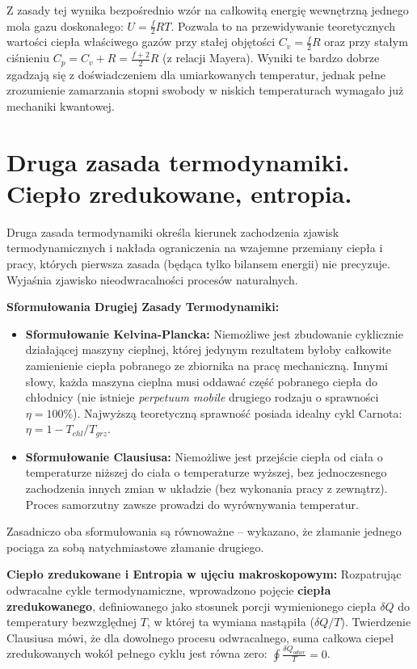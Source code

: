 \documentclass[11pt, a4paper]{article}
\begin{document}
Z zasady tej wynika bezpośrednio wzór na całkowitą energię wewnętrzną jednego mola gazu doskonałego: $U = \frac{f}{2}RT$. Pozwala to na przewidywanie teoretycznych wartości ciepła właściwego gazów przy stałej objętości $C_v = \frac{f}{2}R$ oraz przy stałym ciśnieniu $C_p = C_v + R = \frac{f+2}{2}R$ (z relacji Mayera). Wyniki te bardzo dobrze zgadzają się z doświadczeniem dla umiarkowanych temperatur, jednak pełne zrozumienie zamarzania stopni swobody w niskich temperaturach wymagało już mechaniki kwantowej.

\section{Druga zasada termodynamiki. Ciepło zredukowane, entropia.}

Druga zasada termodynamiki określa kierunek zachodzenia zjawisk termodynamicznych i nakłada ograniczenia na wzajemne przemiany ciepła i pracy, których pierwsza zasada (będąca tylko bilansem energii) nie precyzuje. Wyjaśnia zjawisko nieodwracalności procesów naturalnych.

\textbf{Sformułowania Drugiej Zasady Termodynamiki:}
\begin{itemize}
    \item \textbf{Sformułowanie Kelvina-Plancka:} Niemożliwe jest zbudowanie cyklicznie działającej maszyny cieplnej, której jedynym rezultatem byłoby całkowite zamienienie ciepła pobranego ze zbiornika na pracę mechaniczną. Innymi słowy, każda maszyna cieplna musi oddawać część pobranego ciepła do chłodnicy (nie istnieje \textit{perpetuum mobile} drugiego rodzaju o sprawności $\eta = 100\%$). Najwyższą teoretyczną sprawność posiada idealny cykl Carnota: $\eta = 1 - T_{chl}/T_{grz}$.
    \item \textbf{Sformułowanie Clausiusa:} Niemożliwe jest przejście ciepła od ciała o temperaturze niższej do ciała o temperaturze wyższej, bez jednoczesnego zachodzenia innych zmian w układzie (bez wykonania pracy z zewnątrz). Proces samorzutny zawsze prowadzi do wyrównywania temperatur.
\end{itemize}
Zasadniczo oba sformułowania są równoważne – wykazano, że złamanie jednego pociąga za sobą natychmiastowe złamanie drugiego.

\textbf{Ciepło zredukowane i Entropia w ujęciu makroskopowym:}
Rozpatrując odwracalne cykle termodynamiczne, wprowadzono pojęcie \textbf{ciepła zredukowanego}, definiowanego jako stosunek porcji wymienionego ciepła $\delta Q$ do temperatury bezwzględnej $T$, w której ta wymiana nastąpiła ($\delta Q/T$). Twierdzenie Clausiusa mówi, że dla dowolnego procesu odwracalnego, suma całkowa ciepeł zredukowanych wokół pełnego cyklu jest równa zero: $\oint \frac{\delta Q_{odwr}}{T} = 0$. 
\end{document}
